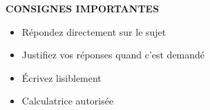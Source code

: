 

\begin{consignebox}
	 \textbf{CONSIGNES IMPORTANTES}
	\begin{itemize}[leftmargin=*,noitemsep,topsep=5pt]
		\item[\faIcon{check}] Répondez directement sur le sujet
		\item[\faIcon{check}] Justifiez vos réponses quand c'est demandé
		\item[\faIcon{pencil-alt}] Écrivez lisiblement
		\item[\faIcon{calculator}] Calculatrice autorisée
	\end{itemize}
\end{consignebox}

\smallspace

